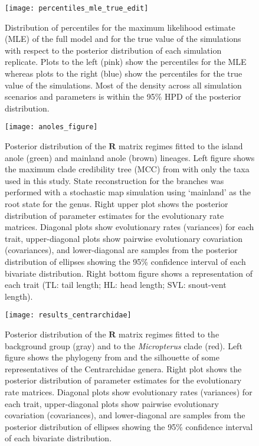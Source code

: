 \begin{figure}[h]
	\centering
	\texttt{[image: percentiles\_mle\_true\_edit]}
	\caption[Distribution of percentiles for the maximum likelihood estimate (MLE) of the full model and for the true value of the simulations with respect to the posterior distribution of each simulation replicate.]{Distribution of percentiles for the maximum likelihood estimate (MLE) of the full model and for the true value of the simulations with respect to the posterior distribution of each simulation replicate. Plots to the left (pink) show the percentiles for the MLE whereas plots to the right (blue) show the percentiles for the true value of the simulations. Most of the density across all simulation scenarios and parameters is within the 95\% HPD of the posterior distribution.}
	\label{fig:quantiles}
\end{figure}

\begin{figure}[h]
	\centering
	\texttt{[image: anoles\_figure]}
	\caption[Posterior distribution of the $\mathbf{R}$ matrix regimes fitted to the island anole and mainland anole lineages.]{Posterior distribution of the $\mathbf{R}$ matrix regimes fitted to the island anole (green) and mainland anole (brown) lineages. Left figure shows the maximum clade credibility tree (MCC) from \citet{gamble_anolis_2014} with only the taxa used in this study. State reconstruction for the branches was performed with a stochastic map simulation using `mainland' as the root state for the genus. Right upper plot shows the posterior distribution of parameter estimates for the evolutionary rate matrices. Diagonal plots show evolutionary rates (variances) for each trait, upper-diagonal plots show pairwise evolutionary covariation (covariances), and lower-diagonal are samples from the posterior distribution of ellipses showing the 95\% confidence interval of each bivariate distribution. Right bottom figure shows a representation of each trait (TL: tail length; HL: head length; SVL: snout-vent length).}
	\label{fig:anoles}
\end{figure}

\begin{figure}[h]
	\centering
	\texttt{[image: results\_centrarchidae]}
	\caption[Posterior distribution of the $\mathbf{R}$ matrix regimes fitted to the background group and to the \textit{Micropterus} clade.]{Posterior distribution of the $\mathbf{R}$ matrix regimes fitted to the background group (gray) and to the \textit{Micropterus} clade (red). Left figure shows the phylogeny from \citep{revell_phylogenetic_2009} and the silhouette of some representatives of the Centrarchidae genera. Right plot shows the posterior distribution of parameter estimates for the evolutionary rate matrices. Diagonal plots show evolutionary rates (variances) for each trait, upper-diagonal plots show pairwise evolutionary covariation (covariances), and lower-diagonal are samples from the posterior distribution of ellipses showing the 95\% confidence interval of each bivariate distribution.}
	\label{fig:centrarchidae}
\end{figure}

